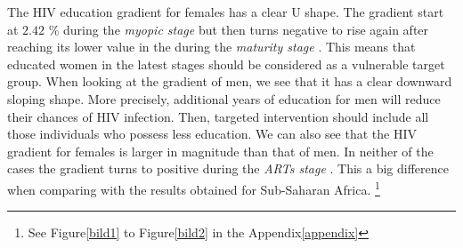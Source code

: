  The HIV education gradient for females has a clear U shape. The gradient start at $2.42$ $\%$ during the \textit{myopic stage} but then turns negative  to rise again after reaching its lower value in the during the \textit{maturity stage} . This means that educated women in the latest stages should be considered as a vulnerable target group. When looking at the gradient of men, we see that it has a clear downward sloping shape. More precisely, additional years of education for men will reduce their chances of HIV infection. Then, targeted intervention should include all those individuals  who possess less education.  We can also see that the HIV gradient for females is larger in magnitude than that of men. In neither of the cases the gradient turns to positive during the \textit{ARTs stage} . This a big difference when comparing with the results obtained for Sub-Saharan Africa. \footnote{See Figure\ref{bild1} to Figure\ref{bild2} in the Appendix\ref{appendix}}
 

